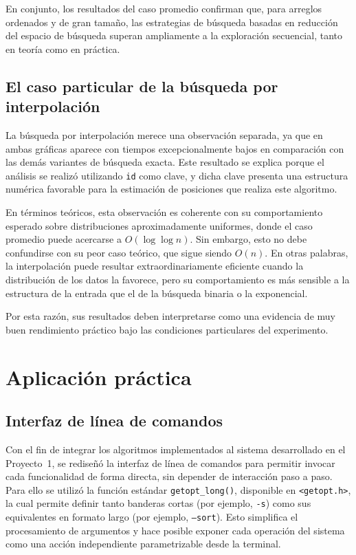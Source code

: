 En conjunto, los resultados del caso promedio confirman que, para arreglos ordenados y de gran tamaño, las estrategias de búsqueda basadas en reducción del espacio de búsqueda superan ampliamente a la exploración secuencial, tanto en teoría como en práctica.

\subsection*{El caso particular de la búsqueda por interpolación}
La búsqueda por interpolación merece una observación separada, ya que en ambas gráficas aparece con tiempos excepcionalmente bajos en comparación con las demás variantes de búsqueda exacta. Este resultado se explica porque el análisis se realizó utilizando \texttt{id} como clave, y dicha clave presenta una estructura numérica favorable para la estimación de posiciones que realiza este algoritmo.

En términos teóricos, esta observación es coherente con su comportamiento esperado sobre distribuciones aproximadamente uniformes, donde el caso promedio puede acercarse a $O(\log \log n)$. Sin embargo, esto no debe confundirse con su peor caso teórico, que sigue siendo $O(n)$. En otras palabras, la interpolación puede resultar extraordinariamente eficiente cuando la distribución de los datos la favorece, pero su comportamiento es más sensible a la estructura de la entrada que el de la búsqueda binaria o la exponencial.

Por esta razón, sus resultados deben interpretarse como una evidencia de muy buen rendimiento práctico bajo las condiciones particulares del experimento.

\newpage
\section{Aplicación práctica}

\subsection{Interfaz de línea de comandos}

Con el fin de integrar los algoritmos implementados al sistema desarrollado en el Proyecto~1, se rediseñó la interfaz de línea de comandos para permitir invocar cada funcionalidad de forma directa, sin depender de interacción paso a paso. Para ello se utilizó la función estándar \texttt{getopt\_long()}, disponible en \texttt{<getopt.h>}, la cual permite definir tanto banderas cortas (por ejemplo, \texttt{-s}) como sus equivalentes en formato largo (por ejemplo, \texttt{--sort}). Esto simplifica el procesamiento de argumentos y hace posible exponer cada operación del sistema como una acción independiente parametrizable desde la terminal.

